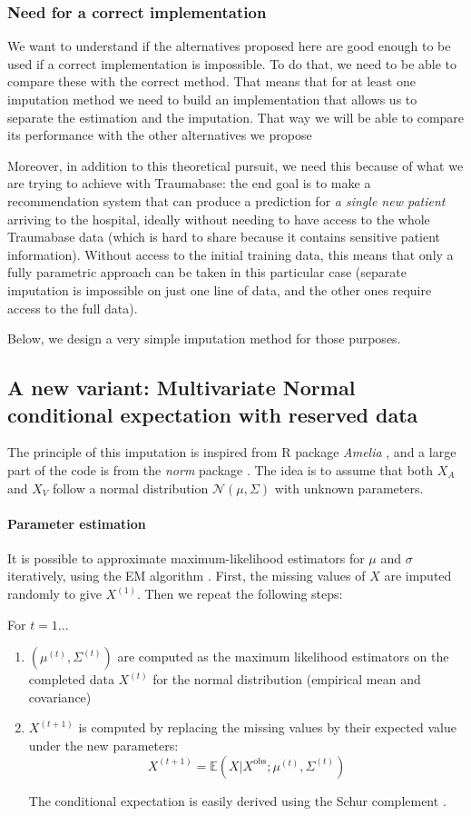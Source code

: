 \documentclass[12pt, a4paper]{memoir}
\begin{document}
			\subsubsection{Need for a correct implementation}
We want to understand if the alternatives proposed here are good enough to be used if a correct implementation is impossible. To do that, we need to be able to compare these with the correct method. That means that for at least one imputation method we need to build an implementation that allows us to separate the estimation and the imputation. That way we will be able to compare its performance with the other alternatives we propose

Moreover, in addition to this theoretical pursuit, we need this because of what we are trying to achieve with Traumabase: the end goal is to make a recommendation system that can produce a prediction for \emph{a single new patient} arriving to the hospital, ideally without needing to have access to the whole Traumabase data (which is hard to share because it contains sensitive patient information). Without access to the initial training data, this means that only a fully parametric approach can be taken in this particular case (separate imputation is impossible on just one line of data, and the other ones require access to the full data).

Below, we design a very simple imputation method for those purposes.

		\subsection{A new variant: Multivariate Normal conditional expectation with reserved data}
The principle of this imputation is inspired from R package \emph{Amelia} \cite{ref_amelia}, and a large part of the code is from the \emph{norm} package \cite{pkg_norm}. The idea is to assume that both $X_A$ and $X_V$ follow a normal distribution $\mathcal{N}(\mu, \Sigma)$ with unknown parameters.

\paragraph{Parameter estimation}
It is possible to approximate maximum-likelihood estimators for $\mu$ and $\sigma$ iteratively, using the EM algorithm \cite{EM} \cite{em_normal_fit}. First, the missing values of $X$ are imputed randomly to give $X^{(1)}$. Then we repeat the following steps:

For $t=1...$
\begin{enumerate}
\item $(\mu^{(t)}, \Sigma^{(t)})$ are computed as the maximum likelihood estimators on the completed data $X^{(t)}$ for the normal distribution (empirical mean and covariance)
\item $X^{(t+1)}$ is computed by replacing the missing values by their expected value under the new parameters: 
$$X^{(t+1)} = \mathbb{E}(X \vert X^{\text{obs}} ; \mu^{(t)}, \Sigma^{(t)})$$

The conditional expectation is easily derived using the Schur complement \cite{norm_schur}.
\end{enumerate}
\end{document}

